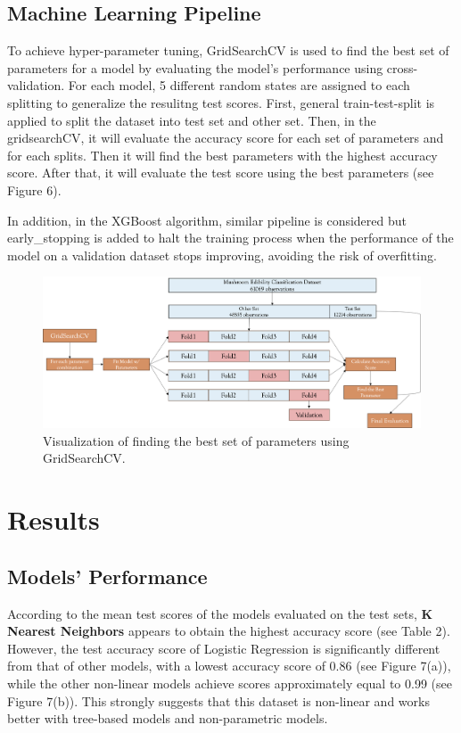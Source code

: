 \documentclass{article}
\begin{document}
\subsection{Machine Learning Pipeline}
\hspace{0.5cm} To achieve hyper-parameter tuning, GridSearchCV is used to find the best set of parameters for a model by evaluating the model's performance using cross-validation. For each model, 5 different random states are assigned to each splitting to generalize the resulitng test scores. First, general train-test-split is applied to split the dataset into test set and other set. Then, in the gridsearchCV, it will evaluate the accuracy score for each set of parameters and for each splits. Then it will find the best parameters with the highest accuracy score. After that, it will evaluate the test score using the best parameters (see Figure 6). 

In addition, in the XGBoost algorithm, similar pipeline is considered but early\_stopping is added to halt the training process when the performance of the model on a validation dataset stops improving, avoiding the risk of overfitting.

\begin{figure}[h]
\centering
\includegraphics[width=1\textwidth]{ml_pipeline.png}
\caption{\label{fig:frog} Visualization of finding the best set of parameters using GridSearchCV.}
\end{figure}

\section{Results}

\subsection{Models' Performance}
\hspace{0.5cm} According to the mean test scores of the models evaluated on the test sets, \textbf{K Nearest Neighbors} appears to obtain the highest accuracy score (see Table 2). However, the test accuracy score of Logistic Regression is significantly different from that of other models, with a lowest accuracy score of 0.86 (see Figure 7(a)), while the other non-linear models achieve scores approximately equal to 0.99 (see Figure 7(b)). This strongly suggests that this dataset is non-linear and works better with tree-based models and non-parametric models.
\end{document}
